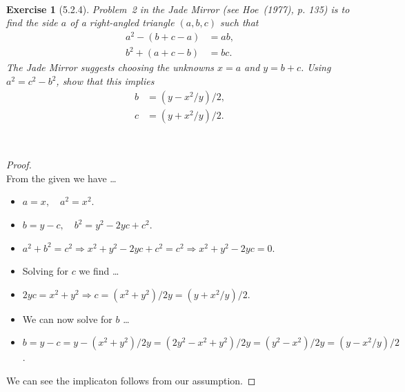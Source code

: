 \documentclass[12pt]{article}
\newcommand{\XB}{\color{black}}
\newcommand{\XBB}{\color{blue}}
\newcommand{\ds}{\displaystyle}
\theoremstyle{plain}
\newtheorem{ex}{Exercise}
\begin{document}
\XBB\hrulefill\XB \\
\begin{ex} [5.2.4]
  Problem~2 in the Jade Mirror (see Hoe~(1977), p. 135) is to find the side $ a $ of a right-angled triangle $ (a, b, c) $ such that
  \begin{align*}
    a^{2} - (b + c - a) &= ab, \\
    b^{2} + (a + c - b) &= bc.
  \end{align*}
  \centering The \emph{Jade Mirror} suggests choosing the unknowns $ x = a $ and $ y = b + c $. Using $ a^{2} = c^{2} - b^{2} $, show that this implies
  \begin{align*}
    b &= (y - x^{2} / y) / 2, \\
    c &= (y + x^{2} / y) / 2.
  \end{align*}
\end{ex}
\XBB\hrulefill\XB \\

\begin{proof}
  \ \\

  From the given we have \dots

  \begin{itemize}
    \item $ \ds a = x, \quad a^{2} = x^{2} $.
    \item $ \ds b = y - c, \quad b^{2} = y^{2} - 2yc + c^{2} $.
    \item $ \ds a^{2} + b^{2} = c^{2} \Rightarrow x^{2} + y^{2} - 2yc + c^{2} = c^{2} \Rightarrow x^{2} + y^{2} - 2yc = 0 $.
    \item Solving for $ c $ we find \dots
    \item $ \ds 2yc = x^{2} + y^{2} \Rightarrow c = (x^{2} + y^{2}) / 2y = (y + x^{2} / y) / 2 $.
    \item We can now solve for $ b $ \dots
    \item $ \ds b = y - c = y - (x^{2} + y^{2}) / 2y = (2y^{2} - x^{2} + y^{2}) / 2y = (y^{2} - x^{2}) / 2y = (y - x^{2} / y) / 2 $. 
  \end{itemize}

  We can see the implicaton follows from our assumption. 

\end{proof}

\newpage
\end{document}
